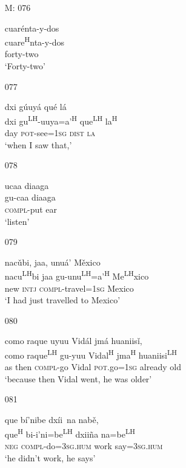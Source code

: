 \begin{itemize}
\item[M: 076]
 
\glll   cuar\'{e}nta-y-dos\\
cuare\textsuperscript{H}nta-y-dos\\
forty-two\\
\glt `Forty-two' 
 

\item[077]
 
\glll  dxi g\'{u}uy\'{a} qu\'{e} l\'{a}\\
dxi gu\textsuperscript{LH}-uuya=a'\textsuperscript{H} que\textsuperscript{LH} la\textsuperscript{H}\\
day \textsc{pot}-see=\textsc{1sg} \textsc{dist} \textsc{la}\\
\glt `when  I saw that,'
 

\item[078]
 
\glll  ucaa diaaga\\
gu-caa diaaga\\
\textsc{compl}-put ear\\
\glt `listen'
 


\item[079]
 
\glll   nac\v{u}bi, jaa, unu\'{a}' M\v{e}xico\\ 
nacu\textsuperscript{LH}bi jaa gu-unu\textsuperscript{LH}=a'\textsuperscript{H} Me\textsuperscript{LH}xico\\
new \textsc{intj} \textsc{compl}-travel=\textsc{1sg} Mexico\\
\glt `I had just travelled to Mexico'
 


\item[080]
 
\glll   como raque uyuu Vid\'{a}l jm\'{a} huaniis\v{i},\\
como raque\textsuperscript{LH} gu-yuu Vidal\textsuperscript{H}  jma\textsuperscript{H} huaniisi\textsuperscript{LH}\\
as then \textsc{compl}-go Vidal \textsc{pot}.go=\textsc{1sg} already old\\
\glt `because then Vidal went, he was older' 
 


\item[081]
 
\glll   que b\'{i}'nibe dx\'{i}i~{n}a nab\v{e}, \\
que\textsuperscript{H} bi-i'ni=be\textsuperscript{LH} dxii\~{n}a na=be\textsuperscript{LH}\\
\textsc{neg} \textsc{compl}-do=\textsc{3sg.hum} work say=\textsc{3sg.hum}\\
\glt `he didn't work, he says'
 



\end{itemize}
